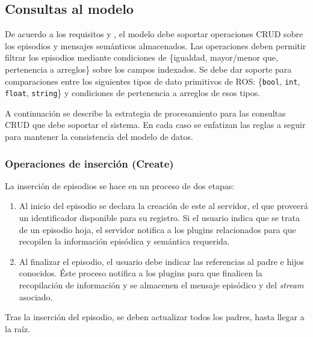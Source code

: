\subsection{Consultas al modelo}

De acuerdo a los requisitos  y , el modelo debe soportar operaciones CRUD sobre los episodios y mensajes semánticos almacenados. Las operaciones deben permitir filtrar los episodios mediante condiciones de \{igualdad, mayor/menor que, pertenencia a arreglos\} sobre los campos indexados. Se debe dar soporte para comparaciones entre los siguientes tipos de dato primitivos de ROS: \{\texttt{bool}, \texttt{int}, \texttt{float}, \texttt{string}\} y condiciones de pertenencia a arreglos de esos tipos.

A continuación se describe la estrategia de procesamiento para las consultas CRUD que debe soportar el sistema. En cada caso se enfatizan las reglas a seguir para mantener la consistencia del modelo de datos.

\subsubsection{Operaciones de inserción (Create)}

La inserción de episodios se hace en un proceso de dos etapas:
\begin{enumerate}
\item  Al inicio del episodio se declara la creación de este al servidor, el que proveerá un identificador disponible para su registro. Si el usuario indica que se trata de un episodio hoja, el servidor notifica a los plugins relacionados para que recopilen la información episódica y semántica requerida.
\item  Al finalizar el episodio, el usuario debe indicar las referencias al padre e hijos conocidos. Éste proceso notifica a los plugins para que finalicen la recopilación de información y se almacenen el mensaje episódico y del \textit{stream} asociado.
\end{enumerate}
Tras la inserción del episodio, se deben actualizar todos los padres, hasta llegar a la raíz.

